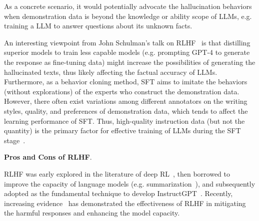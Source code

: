 As a concrete scenario, it would potentially advocate the  hallucination behaviors when demonstration data is beyond the knowledge or ability scope of LLMs, e.g. training a LLM to answer questions about its unknown facts.   

An interesting viewpoint from John Schulman's talk on RLHF~\cite{John-youtube-2023-RLHF} is that distilling superior models to train less capable models (e.g. prompting GPT-4 to generate the response as fine-tuning data) might increase the possibilities of generating the hallucinated texts, thus likely affecting the factual accuracy of LLMs. Furthermore, as a behavior cloning method, SFT aims to imitate the behaviors (without explorations) of the experts who construct the demonstration data. However, there often exist variations among different annotators on the writing styles, quality, and preferences of demonstration data, which tends to affect the learning performance of SFT. Thus, high-quality instruction data (but not the quantity) is the primary factor for effective training of LLMs during the SFT stage~\cite{Touvron-2023-llama2-arxiv}.  

\textbf{Pros and Cons of RLHF}. 

RLHF was early explored in the literature of deep RL~\cite{Christiano-NeurIPS-2017-Deep},  then  borrowed to improve the capacity of language models (e.g. summarization~\cite{Stiennon-arxiv-2020-learning}), and subsequently adopted as the fundamental  technique  to develop InstructGPT~\cite{Ouyang-arxiv-2022-Training}. Recently, increasing evidence~\cite{Touvron-2023-llama2-arxiv,Bai-arXiv-2022-Constitutional} has  demonstrated the effectiveness of RLHF in mitigating the  harmful responses and enhancing the model capacity. 


